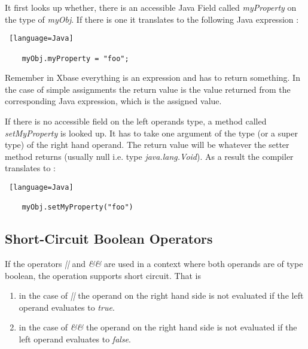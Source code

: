 \documentclass[a4paper,10pt]{scrreprt}
\newlength{\itemindentlen}
\begin{document}
It first looks up whether, there is an accessible Java Field called \emph{myProperty} on the type of \emph{myObj}. If there is one it translates to
the following Java expression :


\begin{lstlisting} [language=Java]

	myObj.myProperty = "foo";

\end{lstlisting}


Remember in Xbase everything is an expression and has to return something. In the case of simple assignments the return value is the value returned from the corresponding
Java expression, which is the assigned value.

If there is no accessible field on the left operands type, a method called \emph{setMyProperty} is looked up. It has to take one argument of the type (or a super type) of the right hand operand.
The return value will be whatever the setter method returns (usually null i.e. type \emph{java.lang.Void}). 
As a result the compiler translates to :


\begin{lstlisting} [language=Java]

	myObj.setMyProperty("foo")

\end{lstlisting}





\subsection{ Short-Circuit Boolean Operators }

If the operators \emph{||} and \emph{\&\&} are used in a context where both operands are of type boolean, the operation supports short circuit.
That is 

\setlength{\itemindentlen}{\textwidth}
\begin{enumerate}
\addtolength{\itemindentlen}{-2em}

\item \begin{minipage}[t]{\itemindentlen}
in the case of \emph{||} the operand on the right hand side is not evaluated if the left operand evaluates to \emph{true}.
\end{minipage}

\item \begin{minipage}[t]{\itemindentlen}
in the case of \emph{\&\&} the operand on the right hand side is not evaluated if the left operand evaluates to \emph{false}.
\end{minipage}

\end{enumerate}
\addtolength{\itemindentlen}{2em}
\end{document}
